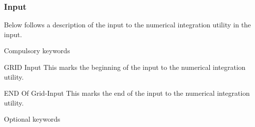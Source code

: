 \subsubsection{Input}

Below follows a description of the input to the numerical integration utility in the
 input.

Compulsory keywords
\begin{keywordlist}
\item[GRID Input]
This marks the beginning of the input to the numerical integration utility.
\item[END Of Grid-Input]
This marks the end of the input to the numerical integration utility.
\end{keywordlist}

Optional keywords
